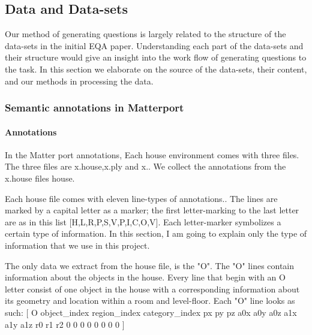 %
%
%
%



\subsection{Data and Data-sets}

 Our method of generating questions is largely related to the structure of the data-sets in the initial EQA paper\cite{embodiedqa}. Understanding each part of the data-sets and their structure would give an insight into the work flow of generating questions to the task. In this section we elaborate on the source of the data-sets, their content, and our methods in processing the data. 
 

\subsubsection{Semantic annotations in Matterport}

\paragraph{Annotations}
In the Matter port annotations, Each house environment comes with three files. The three files are x.house,x.ply and x.. We collect the annotations from the x.house files house. 

Each house file comes with eleven line-types of annotations.. The lines are marked by a capital letter as a marker; the first letter-marking to the last letter are as in this list [H,L,R,P,S,V,P,I,C,O,V]. Each letter-marker symbolizes a certain type of information. In this section, I am going to explain only the type of information that we use in this project.

The only data we extract from the house file, is the "O". The "O" lines contain information about the objects in the house. Every line that begin with an O letter consist of one object in the house with a corresponding information about its geometry and location within a room and level-floor. Each "O" line looks as such: [ O object\_index region\_index category\_index px py pz  a0x a0y a0z  a1x a1y a1z  r0 r1 r2 0 0 0 0 0 0 0 0 ] 

